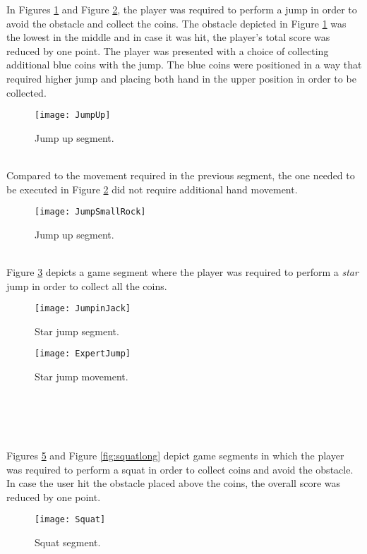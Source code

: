 In Figures \ref{fig:jumpup} and Figure \ref{fig:jumpssmallrock}, the player was required to perform a jump in order to avoid the obstacle and collect the coins. The obstacle depicted in Figure \ref{fig:jumpup} was the lowest in the middle and in case it was hit, the player's total score was reduced by one point. The player was presented with a choice of collecting additional blue coins with the jump. The blue coins were positioned in a way that required higher jump and placing both hand in the upper position in order to be collected.\\
\begin{figure}[h]
    \centering
    \texttt{[image: JumpUp]}
    \caption{Jump up segment.}
    \label{fig:jumpup}
\end{figure}\\
Compared to the movement required in the previous segment, the one needed to be executed in Figure \ref{fig:jumpssmallrock} did not require additional hand movement.\\
\begin{figure}[h]
    \centering
    \texttt{[image: JumpSmallRock]}
    \caption{Jump up segment.}
    \label{fig:jumpssmallrock}
\end{figure}\\
Figure \ref{fig:star} depicts a game segment where the player was required to perform a \textit{star} jump in order to collect all the coins.\\
\begin{figure}[h]
    \centering
    \texttt{[image: JumpinJack]}
    \caption{Star jump segment.}
    \label{fig:star}
\end{figure}
\begin{figure}[h]
    \centering
    \texttt{[image: ExpertJump]}
    \caption{Star jump movement.}
    \label{fig:expertstarjump}
\end{figure}\\\\\\\\
Figures \ref{fig:squat} and Figure \ref{fig:squatlong} depict game segments in which the player was required to perform a squat in order to collect coins and avoid the obstacle. In case the user hit the obstacle placed above the coins, the overall score was reduced by one point.\\
\begin{figure}[h]
    \centering
    \texttt{[image: Squat]}
    \caption{Squat segment.}
    \label{fig:squat}
\end{figure}
